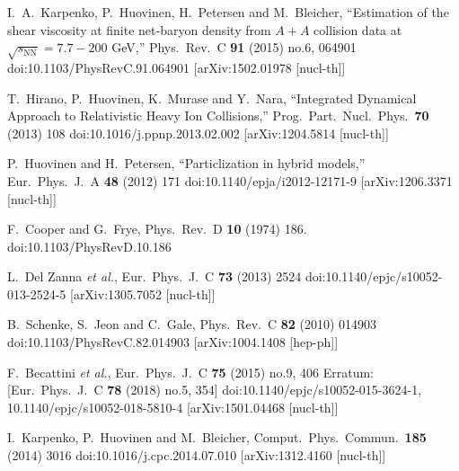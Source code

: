 \documentclass[12pt, a4paper]{report}
\begin{document}
\begin{thebibliography}{20}
	I.~A.~Karpenko, P.~Huovinen, H.~Petersen and M.~Bleicher,
	``Estimation of the shear viscosity at finite net-baryon density from $A+A$ collision data at $\sqrt{s_\mathrm{NN}} = 7.7-200$ GeV,''
	Phys.\ Rev.\ C {\bf 91} (2015) no.6,  064901
	doi:10.1103/PhysRevC.91.064901
	[arXiv:1502.01978 [nucl-th]]
	
	T.~Hirano, P.~Huovinen, K.~Murase and Y.~Nara,
	``Integrated Dynamical Approach to Relativistic Heavy Ion Collisions,''
	Prog.\ Part.\ Nucl.\ Phys.\  {\bf 70} (2013) 108
	doi:10.1016/j.ppnp.2013.02.002
	[arXiv:1204.5814 [nucl-th]]
	
	P.~Huovinen and H.~Petersen,
	``Particlization in hybrid models,''
	Eur.\ Phys.\ J.\ A {\bf 48} (2012) 171
	doi:10.1140/epja/i2012-12171-9
	[arXiv:1206.3371 [nucl-th]]
	
	F.~Cooper and G.~Frye,
	Phys.\ Rev.\ D {\bf 10} (1974) 186.
	doi:10.1103/PhysRevD.10.186
	
	L.~Del Zanna {\it et al.},
	Eur.\ Phys.\ J.\ C {\bf 73} (2013) 2524
	doi:10.1140/epjc/s10052-013-2524-5
	[arXiv:1305.7052 [nucl-th]]
	
	B.~Schenke, S.~Jeon and C.~Gale,
	Phys.\ Rev.\ C {\bf 82} (2010) 014903
	doi:10.1103/PhysRevC.82.014903
	[arXiv:1004.1408 [hep-ph]]
	
	F.~Becattini {\it et al.},
	Eur.\ Phys.\ J.\ C {\bf 75} (2015) no.9,  406
	Erratum: [Eur.\ Phys.\ J.\ C {\bf 78} (2018) no.5,  354]
	doi:10.1140/epjc/s10052-015-3624-1, 10.1140/epjc/s10052-018-5810-4
	[arXiv:1501.04468 [nucl-th]]
	
	I.~Karpenko, P.~Huovinen and M.~Bleicher,
	Comput.\ Phys.\ Commun.\  {\bf 185} (2014) 3016
	doi:10.1016/j.cpc.2014.07.010
	[arXiv:1312.4160 [nucl-th]]
	
\end{thebibliography}
	
\end{document}
